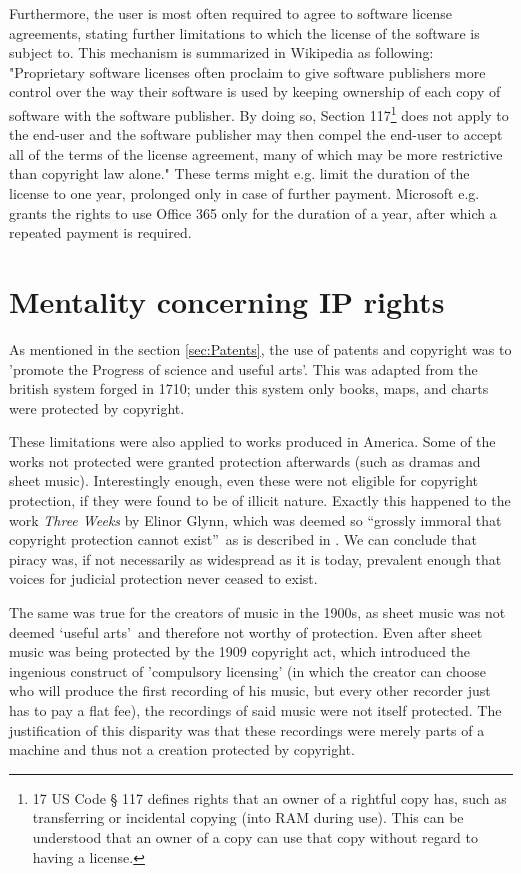 \documentclass[a4paper]{report}
\begin{document}
Furthermore, the user is most often required to agree to software license agreements, stating further limitations to which the license of the software is subject to. This mechanism is summarized in Wikipedia as following: "Proprietary software licenses often proclaim to give software publishers more control over the way their software is used by keeping ownership of each copy of software with the software publisher. By doing so, Section 117\footnote{17 US Code § 117 defines rights that an owner of a rightful copy has, such as transferring or incidental copying (into RAM during use). This can be understood that an owner of a copy can use that copy without regard to having a license.} does not apply to the end-user and the software publisher may then compel the end-user to accept all of the terms of the license agreement, many of which may be more restrictive than copyright law alone."\parencite{WikiSoftLic} These terms might e.g. limit the duration of the license to one year, prolonged only in case of further payment. Microsoft e.g. grants the rights to use Office 365 only for the duration of a year, after which a repeated payment is required\parencite{Off365}.

\section{Mentality concerning IP rights}
\label{sec:IPMent}

As mentioned in the section \ref{sec:Patents}, the use of patents and copyright was to 'promote the Progress of science and useful arts'. This was adapted from the british system forged in 1710; under this system only books, maps, and charts were protected by copyright. \parencite[3]{Cummings2010}

These limitations were also applied to works produced in America. Some of the works not protected were granted protection afterwards (such as dramas and sheet music). Interestingly enough, even these were not eligible for copyright protection, if they were found to be of illicit nature.  Exactly this happened to the work \textit{Three Weeks} by Elinor Glynn, which was deemed so \textquotedblleft grossly immoral that copyright protection cannot exist\textquotedblright\ as is described in \cite{Fox1945}.
We can conclude that piracy was, if not necessarily as widespread as it is today, prevalent enough that voices for judicial protection never ceased to exist.

The same was true for the creators of music in the 1900s, as sheet music was not deemed \textquoteleft useful arts\textquoteright\ and therefore not worthy of protection. Even after sheet music was being protected by the 1909 copyright act, which introduced the ingenious construct of 'compulsory licensing' (in which the creator can choose who will produce the first recording of his music, but every other recorder just has to pay a flat fee), the recordings of said music were not itself protected. The justification of this disparity was that these recordings were merely parts of a machine and thus not a creation protected by copyright.
\end{document}
